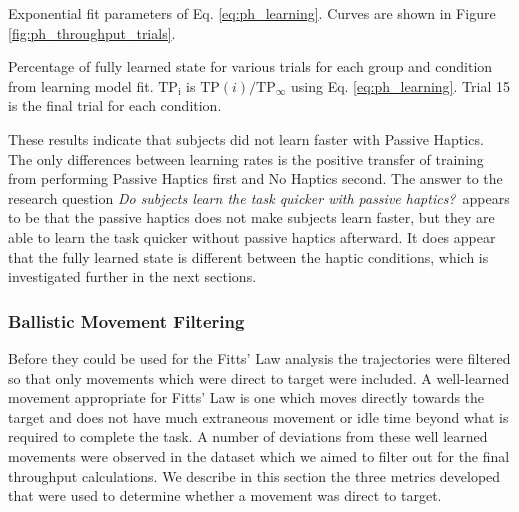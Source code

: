 \begin{table}
    \centering
    \caption{Exponential fit parameters of Eq. \ref{eq:ph_learning}. Curves are shown in Figure \ref{fig:ph_throughput_trials}.}
    \label{tab:ph_tp_regression}
\end{table}

\begin{table}
    \centering
    \caption{Percentage of fully learned state for various trials for each group and condition from learning model fit. $\mathrm{TP_i}$ is $\mathrm{TP}(i)/\mathrm{TP}_{\infty}$ using Eq. \ref{eq:ph_learning}. Trial 15 is the final trial for each condition.}
    \label{tab:ph_tp_regression_values}
\end{table}

These results indicate that subjects did not learn faster with Passive Haptics.
The only differences between learning rates is the positive transfer of training from performing Passive Haptics first and No Haptics second.
The answer to the research question \textit{Do subjects learn the task quicker with passive haptics?}\ appears to be that the passive haptics does not make subjects learn faster, but they are able to learn the task quicker without passive haptics afterward.
It does appear that the fully learned state is different between the haptic conditions, which is investigated further in the next sections.

\subsubsection{Ballistic Movement Filtering}
\label{sec:ph_ballistic_filter}

Before they could be used for the Fitts' Law analysis the trajectories were filtered so that only movements which were direct to target were included.
A well-learned movement appropriate for Fitts' Law is one which moves directly towards the target and does not have much extraneous movement or idle time beyond what is required to complete the task.
A number of deviations from these well learned movements were observed in the dataset which we aimed to filter out for the final throughput calculations.
We describe in this section the three metrics developed that were used to determine whether a movement was direct to target.


